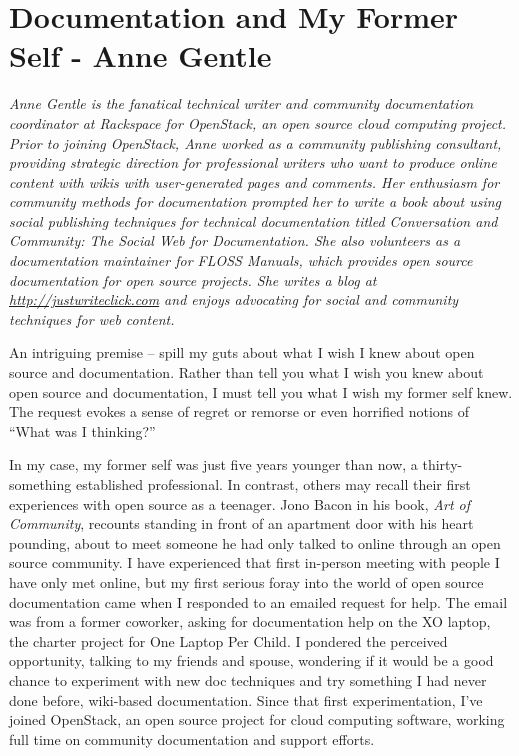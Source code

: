 \chapter{Documentation and My Former Self - Anne Gentle}

\textit{Anne Gentle is the fanatical technical writer and community documentation coordinator at Rackspace for OpenStack, an open source cloud computing project. Prior to joining OpenStack, Anne worked as a community publishing consultant, providing strategic direction for professional writers who want to produce online content with wikis with user-generated pages and comments. Her enthusiasm for community methods for documentation prompted her to write a book about using social publishing techniques for technical documentation titled Conversation and Community: The Social Web for Documentation. She also volunteers as a documentation maintainer for FLOSS Manuals, which provides open source documentation for open source projects. She writes a blog at \url{http://justwriteclick.com} and enjoys advocating for social and community techniques for web content.}

An intriguing premise -- spill my guts about what I wish I knew about open source and documentation. Rather than tell you what I wish you knew about open source and documentation, I must tell you what I wish my former self knew. The request evokes a sense of regret or remorse or even horrified notions of ``What was I thinking?'' 

In my case, my former self was just five years younger than now, a thirty-something established professional. In contrast, others may recall their first experiences with open source as a teenager. Jono Bacon in his book, \textit{Art of Community}, recounts standing in front of an apartment door with his heart pounding, about to meet someone he had only talked to online through an open source community. I have experienced that first in-person meeting with people I have only met online, but my first serious foray into the world of open source documentation came when I responded to an emailed request for help. The email was from a former coworker, asking for documentation help on the XO laptop, the charter project for One Laptop Per Child. I pondered the perceived opportunity, talking to my friends and spouse, wondering if it would be a good chance to experiment with new doc techniques and try something I had never done before, wiki-based documentation. Since that first experimentation, I've joined OpenStack, an open source project for cloud computing software, working full time on community documentation and support efforts. 

